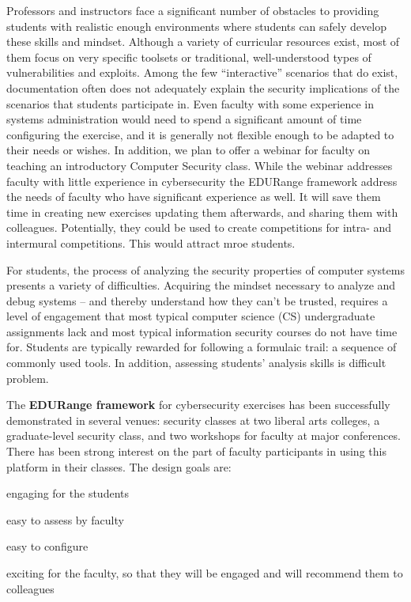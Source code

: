  Professors and instructors face a significant number of
obstacles to providing students with realistic enough environments
where students can safely develop these skills and mindset.  Although
a variety of curricular resources exist, most of them focus on very specific
toolsets or traditional, well-understood types of vulnerabilities and
exploits.  Among the few ``interactive'' scenarios that do exist, documentation
 often  does not adequately explain the
security implications of the scenarios that students participate in.  Even faculty
with some experience in systems administration would need to 
spend a significant amount of time configuring the exercise, and it is 
generally not flexible enough to be adapted to their needs or wishes.
In addition, we plan to offer a webinar for faculty on teaching an introductory 
Computer Security class.  While the webinar addresses faculty with little experience
in cybersecurity
the EDURange framework address the needs of  faculty who have
significant experience as well.  It will save them time in creating new exercises
 updating them afterwards, and sharing them with colleagues.  Potentially, they could be
used to create competitions for intra- and intermural competitions.  This would attract 
mroe students.



For students, the process of analyzing the security
properties of computer systems presents a variety of difficulties.
Acquiring the mindset necessary to analyze and debug systems -- and
thereby understand how they can't be trusted, requires a level
of engagement that most typical computer science (CS) undergraduate assignments lack and
most typical information security courses do not have time for.  
Students are typically rewarded for following a formulaic trail: a sequence
of commonly used tools.  In addition, assessing students' analysis skills is  difficult 
problem.


The {\bf EDURange framework} for cybersecurity exercises has been successfully demonstrated 
in several venues: security classes at two liberal arts colleges, a graduate-level security class, and
two workshops for faculty at major conferences.  There has been strong interest on the part of
faculty participants in using this platform in their classes.  The design goals are:
\begin{packenum}
\item engaging for the students
\item easy to assess by faculty
\item easy to configure
\item exciting for the faculty, so that they will be engaged and will recommend them
  to colleagues
\end{packenum}

